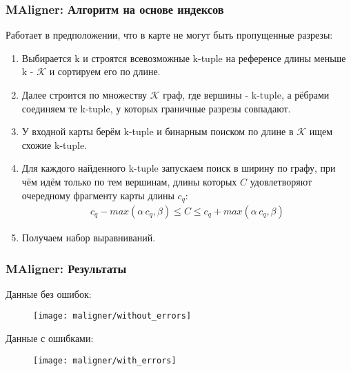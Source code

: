 \begin{frame}
\frametitle{MAligner: Алгоритм на основе индексов}
Работает в предположении, что в карте не могут быть пропущенные разрезы:
\begin{enumerate}
  \item Выбирается k и строятся всевозможные k-tuple на референсе длины меньше k - $\mathcal{K}$ и сортируем его по длине.
  \item Далее строится по множеству $\mathcal{K}$ граф, где вершины - k-tuple, а рёбрами соединяем те k-tuple, у которых граничные разрезы совпадают.
  \item У входной карты берём k-tuple и бинарным поиском по длине в $\mathcal{K}$ ищем схожие k-tuple.
  \item Для каждого найденного k-tuple  запускаем поиск в ширину по графу, при чём идём только по тем вершинам, длины которых $C$ удовлетворяют очередному фрагменту карты длины $c_q$:
  \begin{gather*}
     c_q - max(\alpha \, c_q, \beta) \le C \le c_q + max(\alpha \, c_q, \beta)
  \end{gather*}
  \item Получаем набор выравниваний.
\end{enumerate}
\end{frame}

\begin{frame}
\frametitle{MAligner: Результаты}
  Данные без ошибок:
  \begin{figure}
    \centering
    \texttt{[image: maligner/without\_errors]}
  \end{figure}
  Данные с ошибками:
  \begin{figure}
    \centering
    \texttt{[image: maligner/with\_errors]}
  \end{figure}

\end{frame}
